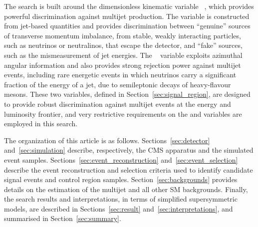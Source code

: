 The search is built around the dimensionless kinematic variable
\alphat~\cite{Randall:2008rw, RA1Paper}, which provides powerful
discrimination against multijet production. The \alphat variable is
constructed from jet-based quantities and provides discrimination
between ``genuine'' sources of transverse momentum imbalance, from
stable, weakly interacting particles, such as neutrinos or
neutralinos, that escape the detector, and ``fake'' sources, such as
the mismeasurement of jet energies.  The \bdphi~\cite{RA1Paper}
variable exploits azimuthal angular information and also provides
strong rejection power against multijet events, including rare
energetic events in which neutrinos carry a significant fraction of
the energy of a jet, due to semileptonic decays of heavy-flavour
mesons.  These two variables, defined in
Section~\ref{sec:signal_region}, are designed to provide robust
discrimination against multijet events at the energy and luminosity
frontier, and very restrictive requirements on the \alphat and \dphi
variables are employed in this search.

The organization of this article is as
follows. Sections~\ref{sec:detector} and~\ref{sec:simulation}
describe, respectively, the CMS apparatus and the simulated event
samples. Sections~\ref{sec:event_reconstruction}
and~\ref{sec:event_selection} describe the event reconstruction and
selection criteria used to identify candidate signal events and
control region samples. Section~\ref{sec:backgrounds} provides details
on the estimation of the multijet and all other SM
backgrounds. Finally, the search results and interpretations, in terms
of simplified supersymmetric models, are described in
Sections~\ref{sec:result} and~\ref{sec:interpretations}, and
summarised in Section~\ref{sec:summary}.



